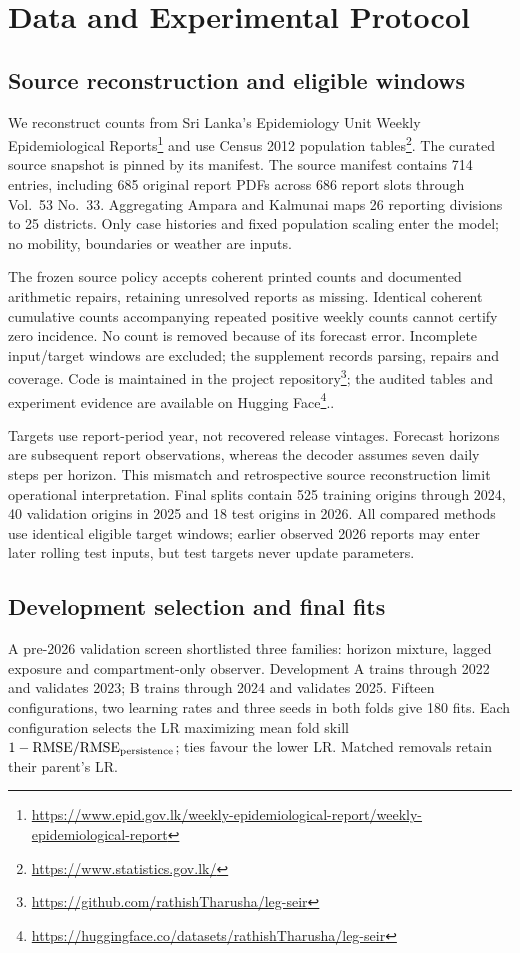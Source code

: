 \documentclass[conference]{IEEEtran}
\begin{document}
\section{Data and Experimental Protocol}
\subsection{Source reconstruction and eligible windows}
We reconstruct counts from Sri Lanka's Epidemiology Unit Weekly Epidemiological Reports\footnote{\url{https://www.epid.gov.lk/weekly-epidemiological-report/weekly-epidemiological-report}} and use Census 2012 population tables\footnote{\url{https://www.statistics.gov.lk/}}. The curated source snapshot is pinned by its manifest. The source manifest contains 714 entries, including 685 original report PDFs across 686 report slots through Vol.~53 No.~33. Aggregating Ampara and Kalmunai maps 26 reporting divisions to 25 districts. Only case histories and fixed population scaling enter the model; no mobility, boundaries or weather are inputs.

The frozen source policy accepts coherent printed counts and documented arithmetic repairs, retaining unresolved reports as missing. Identical coherent cumulative counts accompanying repeated positive weekly counts cannot certify zero incidence. No count is removed because of its forecast error. Incomplete input/target windows are excluded; the supplement records parsing, repairs and coverage. Code is maintained in the project repository\footnote{\url{https://github.com/rathishTharusha/leg-seir}}; the audited tables and experiment evidence are available on Hugging Face\footnote{\url{https://huggingface.co/datasets/rathishTharusha/leg-seir}}..

Targets use report-period year, not recovered release vintages. Forecast horizons are subsequent report observations, whereas the decoder assumes seven daily steps per horizon. This mismatch and retrospective source reconstruction limit operational interpretation. Final splits contain 525 training origins through 2024, 40 validation origins in 2025 and 18 test origins in 2026. All compared methods use identical eligible target windows; earlier observed 2026 reports may enter later rolling test inputs, but test targets never update parameters.

\subsection{Development selection and final fits}
A pre-2026 validation screen shortlisted three families: horizon mixture, lagged exposure and compartment-only observer. Development A trains through 2022 and validates 2023; B trains through 2024 and validates 2025. Fifteen configurations, two learning rates and three seeds in both folds give 180 fits. Each configuration selects the LR maximizing mean fold skill $1-\mathrm{RMSE}/\mathrm{RMSE}_{\rm persistence}$; ties favour the lower LR. Matched removals retain their parent's LR.
\end{document}
